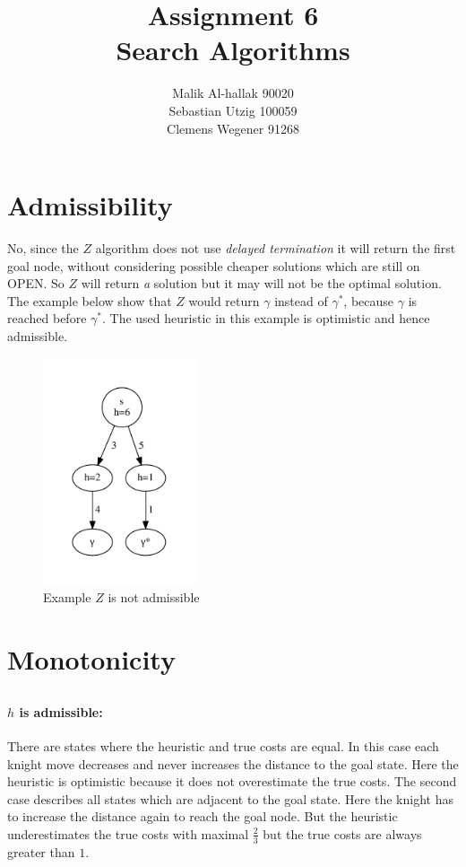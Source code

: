 \documentclass[11pt]{article}
\title{\textbf{Assignment 6\\}Search Algorithms}
\author{Malik Al-hallak 90020\\
		Sebastian Utzig 100059\\
		Clemens Wegener 91268}
\date{}
\begin{document}
\maketitle

\section{Admissibility}
No, since the $Z$ algorithm does not use \emph{delayed termination} it will return the first goal node, without considering possible cheaper solutions which are still on OPEN. So $Z$ will return \emph{a} solution but it may will not be the optimal solution. The example below show that $Z$ would return $\gamma$ instead of $\gamma^*$, because $\gamma$ is reached before $\gamma^*$. The used heuristic in this example is optimistic and hence admissible.

\begin{figure}[H]
	\centering
  \includegraphics[width=0.4\textwidth]{./graph.pdf}
  \caption{Example $Z$ is not admissible}
	\label{fig2}
\end{figure}

\section{Monotonicity}

\subsection{}

\subsection{}
\paragraph{$h$ is admissible:}
There are states where the heuristic and true costs are equal. In this case each knight move decreases and never increases the distance to the goal state. Here the heuristic is optimistic because it does not overestimate the true costs. The second case describes all states which are adjacent to the goal state. Here the knight has to increase the distance again to reach the goal node. But the heuristic underestimates the true costs with maximal $\frac{2}{3}$ but the true costs are always greater than $1$.
\end{document}
